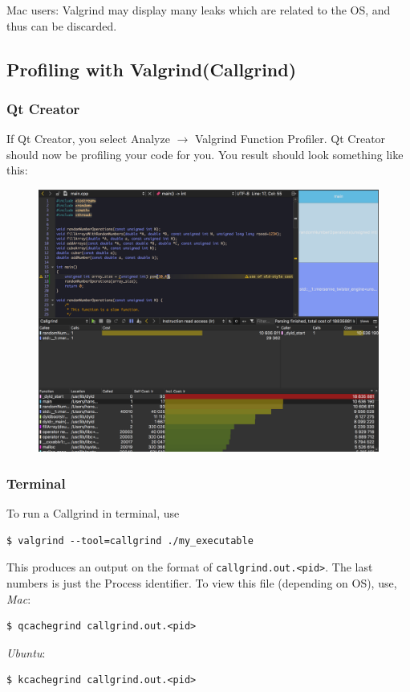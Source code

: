 \documentclass[11pt]{article}
\begin{document}
Mac users: Valgrind may display many leaks which are related to the OS, and thus can be discarded.

\subsection{Profiling with Valgrind(Callgrind)}
\subsubsection{Qt Creator}
If Qt Creator, you select Analyze $\rightarrow$ Valgrind Function Profiler. Qt Creator should now be profiling your code for you. You result should look something like this:
\begin{figure}[H]
    \centering
    \includegraphics[width=\textwidth]{figures/valgrind-qt/callgrind}
\end{figure}

\subsubsection{Terminal}
To run a Callgrind in terminal, use
\begin{lstlisting}
$ valgrind --tool=callgrind ./my_executable
\end{lstlisting}

This produces an output on the format of \texttt{callgrind.out.<pid>}. The last numbers is just the Process identifier. To view this file (depending on OS), use,
\textit{Mac}:
\begin{lstlisting}
$ qcachegrind callgrind.out.<pid>
\end{lstlisting}
\textit{Ubuntu}:
\begin{lstlisting}
$ kcachegrind callgrind.out.<pid>
\end{lstlisting}
\end{document}
